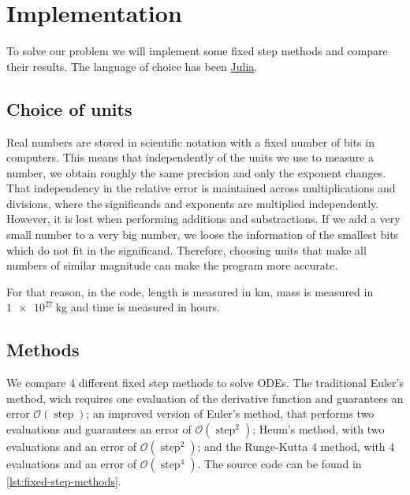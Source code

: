 \documentclass[12pt, onside]{article}
\begin{document}
\section{Implementation}

    To solve our problem we will implement some fixed step methods and compare their results.
The language of choice has been \href{https://julialang.org/}{Julia}.

\subsection{Choice of units}

    Real numbers are stored in scientific notation with a fixed number of bits in computers.
This means that independently of the units we use to measure a number,
we obtain roughly the same precision and only the exponent changes\footnotemark.
That independency in the relative error is maintained across multiplications and divisions,
where the significands and exponents are multiplied independently.
However, it is lost when performing additions and substractions.
If we add a very small number to a very big number,
we loose the information of the smallest bits which do not fit in the significand.
Therefore, choosing units that make all numbers of similar magnitude
can make the program more accurate.


    For that reason, in the code,
length is measured in $\si{\km}$,
mass is measured in $\SI{1e27}{\kg}$ and
time is measured in hours.

\subsection{Methods}

    We compare $4$ different fixed step methods to solve ODEs.
The traditional Euler's method,
wich requires one evaluation of the derivative function and
guarantees an error $\mathcal{O}(\operatorname{step})$;
an improved version of Euler's method,
that performs two evaluations and guarantees an error of $\mathcal{O}(\operatorname{step}^2)$;
Heum's method, with two evaluations and an error of $\mathcal{O}(\operatorname{step}^2)$; and
the Runge-Kutta $4$ method,
with $4$ evaluations and an error of $\mathcal{O}(\operatorname{step}^4)$.
The source code can be found in \cref{lst:fixed-step-methods}.
\end{document}
